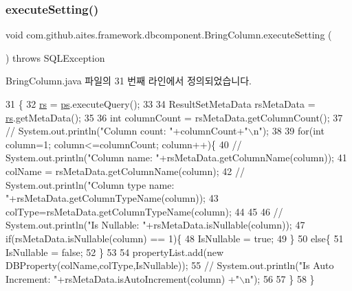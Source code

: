\subsubsection{\texorpdfstring{execute\+Setting()}{executeSetting()}}
{\footnotesize\ttfamily void com.\+github.\+aites.\+framework.\+dbcomponent.\+Bring\+Column.\+execute\+Setting (\begin{DoxyParamCaption}{ }\end{DoxyParamCaption}) throws S\+Q\+L\+Exception}



Bring\+Column.\+java 파일의 31 번째 라인에서 정의되었습니다.


\begin{DoxyCode}
31                                                      \{
32         \mbox{\hyperlink{classcom_1_1github_1_1aites_1_1framework_1_1globalknowledge_1_1_d_b_connector_a36c87b41d86e8382bea688b2ca209764}{rs}} = \mbox{\hyperlink{classcom_1_1github_1_1aites_1_1framework_1_1globalknowledge_1_1_d_b_connector_a2a6dbc151015e5fe147a4d155ae7a145}{ps}}.executeQuery();
33         
34          ResultSetMetaData rsMetaData = \mbox{\hyperlink{classcom_1_1github_1_1aites_1_1framework_1_1globalknowledge_1_1_d_b_connector_a36c87b41d86e8382bea688b2ca209764}{rs}}.getMetaData();
35           
36           \textcolor{keywordtype}{int} columnCount = rsMetaData.getColumnCount();
37          \textcolor{comment}{// System.out.println("Column count: "+columnCount+"\(\backslash\)n");}
38           
39           \textcolor{keywordflow}{for}(\textcolor{keywordtype}{int} column=1; column<=columnCount; column++)\{
40           \textcolor{comment}{//   System.out.println("Column name: "+rsMetaData.getColumnName(column));}
41              colName = rsMetaData.getColumnName(column);
42           \textcolor{comment}{//   System.out.println("Column type name: "+rsMetaData.getColumnTypeName(column));}
43              colType=rsMetaData.getColumnTypeName(column);
44              
45             
46            \textcolor{comment}{//  System.out.println("Is Nullable: "+rsMetaData.isNullable(column));}
47              \textcolor{keywordflow}{if}(rsMetaData.isNullable(column) == 1)\{
48                  IsNullable = \textcolor{keyword}{true};
49              \}
50              \textcolor{keywordflow}{else}\{
51                  IsNullable = \textcolor{keyword}{false};
52              \}
53              
54              propertyList.add(\textcolor{keyword}{new} DBProperty(colName,colType,IsNullable));
55             \textcolor{comment}{// System.out.println("Is Auto Increment: "+rsMetaData.isAutoIncrement(column) +"\(\backslash\)n");}
56              
57           \}
58     \}
\end{DoxyCode}
\mbox{\label{classcom_1_1github_1_1aites_1_1framework_1_1globalknowledge_1_1_d_b_connector_a94ff414cd6c3dcc402787d96136b5788}} 
